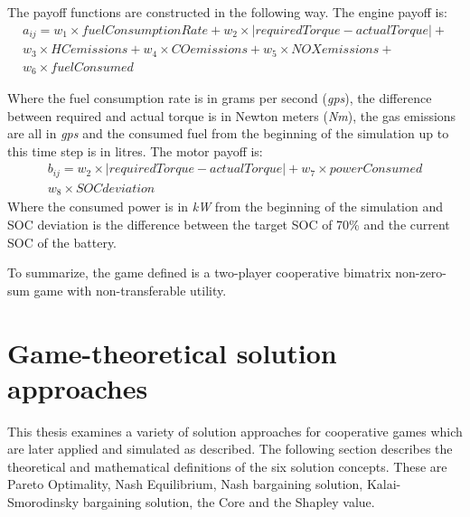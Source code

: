 {The payoff functions are constructed in the following way. The engine payoff is:
\begin{equation}
\label{eq:payoffEngine}
\begin{split}
a_{ij} = w_1 \times fuelConsumptionRate + w_2 \times | requiredTorque - actualTorque | + \\
w_3 \times HCemissions + w_4 \times COemissions + w_5 \times NOXemissions + \\
w_6 \times fuelConsumed
\end{split}
\end{equation}

Where the fuel consumption rate is in grams per second (\textit{gps}), the difference between required and actual torque is in Newton meters (\textit{Nm}), the gas emissions are all in \textit{gps} and the consumed fuel from the beginning of the simulation up to this time step is in litres. The motor payoff is:
\begin{equation}
\label{eq:payoffMotor}
\begin{split}
b_{ij} = w_2 \times | requiredTorque - actualTorque | + w_7 \times powerConsumed\\
w_8 \times SOCdeviation
\end{split}
\end{equation}
Where the consumed power is in \textit{kW} from the beginning of the simulation and SOC deviation is the difference between the target SOC of 70\% and the current SOC of the battery.

To summarize, the game defined is a two-player cooperative bimatrix non-zero-sum game with non-transferable utility.

\section{Game-theoretical solution approaches}
This thesis examines a variety of solution approaches for cooperative games which are later applied and simulated as described. The following section describes the theoretical and mathematical definitions of the six solution concepts. These are Pareto Optimality, Nash Equilibrium, Nash bargaining solution, Kalai-Smorodinsky bargaining solution, the Core and the Shapley value.

}
